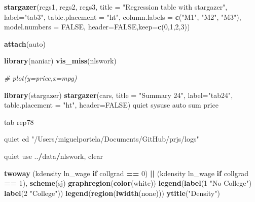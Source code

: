 \documentclass[
  12pt,
]{article}
\newenvironment{Shaded}{\begin{snugshade}}{\end{snugshade}}
\newcommand{\CommentTok}[1]{\textcolor[rgb]{0.56,0.35,0.01}{\textit{#1}}}
\newcommand{\ControlFlowTok}[1]{\textcolor[rgb]{0.13,0.29,0.53}{\textbf{#1}}}
\newcommand{\DataTypeTok}[1]{\textcolor[rgb]{0.13,0.29,0.53}{#1}}
\newcommand{\DecValTok}[1]{\textcolor[rgb]{0.00,0.00,0.81}{#1}}
\newcommand{\KeywordTok}[1]{\textcolor[rgb]{0.13,0.29,0.53}{\textbf{#1}}}
\newcommand{\NormalTok}[1]{#1}
\newcommand{\OperatorTok}[1]{\textcolor[rgb]{0.81,0.36,0.00}{\textbf{#1}}}
\newcommand{\OtherTok}[1]{\textcolor[rgb]{0.56,0.35,0.01}{#1}}
\newcommand{\StringTok}[1]{\textcolor[rgb]{0.31,0.60,0.02}{#1}}
\begin{document}
\begin{Shaded}
\begin{Highlighting}[]
{\KeywordTok{stargazer}\NormalTok{(regs1, regs2, regs3,}
          \DataTypeTok{title =} \StringTok{"Regression table with stargazer"}\NormalTok{,}
          \DataTypeTok{label=}\StringTok{"tab3"}\NormalTok{,}
          \DataTypeTok{table.placement =} \StringTok{"ht"}\NormalTok{,}
          \DataTypeTok{column.labels =} \KeywordTok{c}\NormalTok{(}\StringTok{"M1"}\NormalTok{, }\StringTok{"M2"}\NormalTok{, }\StringTok{"M3"}\NormalTok{),}
          \DataTypeTok{model.numbers =} \OtherTok{FALSE}\NormalTok{,}
          \DataTypeTok{header=}\OtherTok{FALSE}\NormalTok{,}\DataTypeTok{keep=}\KeywordTok{c}\NormalTok{(}\DecValTok{0}\NormalTok{,}\DecValTok{1}\NormalTok{,}\DecValTok{2}\NormalTok{,}\DecValTok{3}\NormalTok{))}

\KeywordTok{attach}\NormalTok{(auto)}


\KeywordTok{library}\NormalTok{(naniar)}
\KeywordTok{vis_miss}\NormalTok{(nlswork)}

\CommentTok{# plot(y=price,x=mpg)}

\KeywordTok{library}\NormalTok{(stargazer)}
\KeywordTok{stargazer}\NormalTok{(cars,}
          \DataTypeTok{title =} \StringTok{"Summary 24"}\NormalTok{,}
          \DataTypeTok{label=}\StringTok{"tab24"}\NormalTok{,}
          \DataTypeTok{table.placement =} \StringTok{"ht"}\NormalTok{,}
          \DataTypeTok{header=}\OtherTok{FALSE}\NormalTok{)}
\NormalTok{quiet sysuse auto}
\NormalTok{sum price}

\NormalTok{tab rep78}

\NormalTok{quiet cd }\StringTok{"/Users/miguelportela/Documents/GitHub/prjs/logs"}

\NormalTok{quiet use ..}\OperatorTok{/}\NormalTok{data}\OperatorTok{/}\NormalTok{nlswork, clear}

\KeywordTok{twoway}\NormalTok{ (kdensity ln_wage }\ControlFlowTok{if}\NormalTok{ collgrad }\OperatorTok{==}\StringTok{ }\DecValTok{0}\NormalTok{) }\OperatorTok{||}\StringTok{ }\NormalTok{(kdensity ln_wage }\ControlFlowTok{if}\NormalTok{ collgrad }\OperatorTok{==}\StringTok{ }\DecValTok{1}\NormalTok{), }\KeywordTok{scheme}\NormalTok{(sj) }\KeywordTok{graphregion}\NormalTok{(}\KeywordTok{color}\NormalTok{(white)) }\KeywordTok{legend}\NormalTok{(}\KeywordTok{label}\NormalTok{(}\DecValTok{1} \StringTok{"No College"}\NormalTok{) }\KeywordTok{label}\NormalTok{(}\DecValTok{2} \StringTok{"College"}\NormalTok{)) }\KeywordTok{legend}\NormalTok{(}\KeywordTok{region}\NormalTok{(}\KeywordTok{lwidth}\NormalTok{(none))) }\KeywordTok{ytitle}\NormalTok{(}\StringTok{"Density"}\NormalTok{)}

}
\end{Highlighting}
\end{Shaded}
\end{document}
